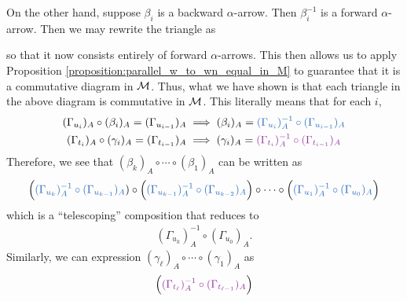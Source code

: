 \begin{prf}
    On the other hand, suppose $\beta_i$ is a backward $\alpha$-arrow. 
    Then $\beta_i^{-1}$ is a forward $\alpha$-arrow.
    Then we may rewrite the triangle as 
    \begin{center}
    \end{center}
    so that it now consists entirely of forward $\alpha$-arrows. This then 
    allows us to apply Proposition \ref{proposition:parallel_w_to_wn_equal_in_M}  
    to guarantee that it is a commutative diagram in $\mathcal{M}$. 
    Thus, what we have shown is that  each triangle in the 
    above diagram is commutative in $\mathcal{M}$. This literally means that 
    for each $i$, 
    \begin{align*}
        (\Gamma_{u_i})_A\circ (\beta_i)_A = (\Gamma_{u_{i-1}})_A
        &\implies 
        (\beta_i)_A = \textcolor{NavyBlue}{(\Gamma_{u_i})_A^{-1} \circ (\Gamma_{u_{i-1}})_A} 
        \\
        (\Gamma_{t_i})_A\circ (\gamma_i)_A = (\Gamma_{t_{i-1}})_A
        &\implies 
        (\gamma_i)_A = \textcolor{Purple}{(\Gamma_{t_i})_A^{-1} \circ (\Gamma_{t_{i-1}})_A}
    \end{align*}
    Therefore, we see that $(\beta_k)_A \circ \cdots \circ (\beta_1)_A$
    can be written as 
    \begin{align*}
        \Big(\textcolor{NavyBlue}{(\Gamma_{u_k})_A^{-1} \circ (\Gamma_{u_{k-1}})_A}\/)
        \circ
        \Big( \textcolor{NavyBlue}{(\Gamma_{u_{k-1}})_A^{-1} \circ (\Gamma_{u_{k-2}})_A}\Big)
        \circ \cdots \circ 
        \Big(\textcolor{NavyBlue}{(\Gamma_{u_1})_A^{-1} \circ (\Gamma_{u_{0}})_A} \Big)
    \end{align*}
    which is a ``telescoping'' composition that reduces to 
    \begin{align*}
        (\Gamma_{u_k})_A^{-1} \circ (\Gamma_{u_{0}})_A.
    \end{align*}
    Similarly, we can expression $(\gamma_{\ell})_A \circ \cdots \circ (\gamma_1)_A$
    as  
    \begin{align*}
        \Big(\textcolor{Purple}{(\Gamma_{t_{\ell}})_A^{-1} \circ (\Gamma_{t_{\ell-1}})_A}\Big)

\end{align*}
\end{prf}
